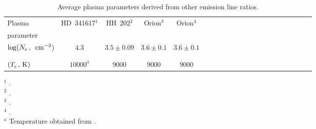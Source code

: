 \documentclass{emulateapj}
\def\unit #1{\,{\rm #1}}
\newcommand\cmcubei{\rm \,\unit{cm^{-3}}}
\begin{document}
\begin{table*}


{\footnotesize
\centering
\begin{minipage}{14cm}
\centering
\caption{ Average plasma parameters derived from other emission line ratios.} \label{Table:obs3}
  \begin{tabular}{lcccccccccccccccccccc} \hline\hline 
	
Plasma					& HD~341617$^1$		&HH~202$^2$ 	&Orion$^3$  &Orion$^4$  		&\\ 
parameter				& \\  \hline         


$\log(N_e \, , \, \cmcubei$)	&$4.3$			&$3.5\pm 0.09$		&$3.6\pm 0.1$	&$3.6\pm 0.1$			\\ \\ \hline \\
			



$(T_e \rm \, , \, K)$	& $ 10000^a$ 	&$ 9000$ 	&$ 9000$ 	&$9000$ 			\\
			
\hline \hline
\end{tabular} 

\begin{minipage}{8cm}%
\begin{flushleft}
{$^1$ \citet{2003A&A...401.1119R}. } \\
{$^2$ \citet{2009MNRAS.395..855M}. } \\
{$^3$ \citet{1991ApJ...374..580B}. } \\
{$^4$ \citet{1998MNRAS.295..401E}. } \\
{$^a$ Temperature obtained from \citet{2000A&A...357..241P}.} \\
\end{flushleft}
\end{minipage}

\end{minipage}
}
\end{table*}
\end{document}
